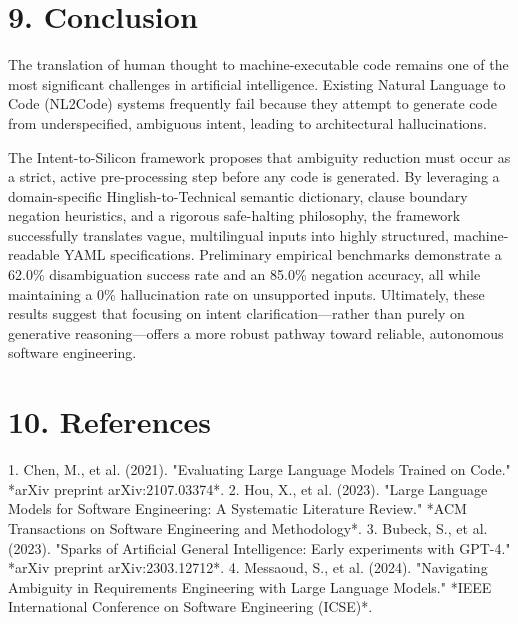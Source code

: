 \documentclass[11pt,a4paper]{article}
\begin{document}
\section{9. Conclusion}

The translation of human thought to machine-executable code remains one of the most significant challenges in artificial intelligence. Existing Natural Language to Code (NL2Code) systems frequently fail because they attempt to generate code from underspecified, ambiguous intent, leading to architectural hallucinations. 

The Intent-to-Silicon framework proposes that ambiguity reduction must occur as a strict, active pre-processing step before any code is generated. By leveraging a domain-specific Hinglish-to-Technical semantic dictionary, clause boundary negation heuristics, and a rigorous safe-halting philosophy, the framework successfully translates vague, multilingual inputs into highly structured, machine-readable YAML specifications. Preliminary empirical benchmarks demonstrate a 62.0\% disambiguation success rate and an 85.0\% negation accuracy, all while maintaining a 0\% hallucination rate on unsupported inputs. Ultimately, these results suggest that focusing on intent clarification—rather than purely on generative reasoning—offers a more robust pathway toward reliable, autonomous software engineering.



\section{10. References}

1. Chen, M., et al. (2021). "Evaluating Large Language Models Trained on Code." *arXiv preprint arXiv:2107.03374*.
2. Hou, X., et al. (2023). "Large Language Models for Software Engineering: A Systematic Literature Review." *ACM Transactions on Software Engineering and Methodology*.
3. Bubeck, S., et al. (2023). "Sparks of Artificial General Intelligence: Early experiments with GPT-4." *arXiv preprint arXiv:2303.12712*.
4. Messaoud, S., et al. (2024). "Navigating Ambiguity in Requirements Engineering with Large Language Models." *IEEE International Conference on Software Engineering (ICSE)*.
\end{document}
